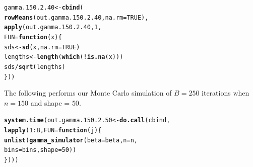 \documentclass[11pt]{article}\usepackage[]{graphicx}\usepackage[]{color}
\makeatletter
\newcommand{\hlnum}[1]{\textcolor[rgb]{0.686,0.059,0.569}{#1}}%
\newcommand{\hlopt}[1]{\textcolor[rgb]{0,0,0}{#1}}%
\newcommand{\hlstd}[1]{\textcolor[rgb]{0.345,0.345,0.345}{#1}}%
\newcommand{\hlkwa}[1]{\textcolor[rgb]{0.161,0.373,0.58}{\textbf{#1}}}%
\newcommand{\hlkwb}[1]{\textcolor[rgb]{0.69,0.353,0.396}{#1}}%
\newcommand{\hlkwc}[1]{\textcolor[rgb]{0.333,0.667,0.333}{#1}}%
\newcommand{\hlkwd}[1]{\textcolor[rgb]{0.737,0.353,0.396}{\textbf{#1}}}%
\newenvironment{kframe}{%
 \def\at@end@of@kframe{}%
 \ifinner\ifhmode%
  \def\at@end@of@kframe{\end{minipage}}%
  \begin{minipage}{\columnwidth}%
 \fi\fi%
 \def\FrameCommand##1{\hskip\@totalleftmargin \hskip-\fboxsep
 \colorbox{shadecolor}{##1}\hskip-\fboxsep
     \hskip-\linewidth \hskip-\@totalleftmargin \hskip\columnwidth}%
 \MakeFramed {\advance\hsize-\width
   \@totalleftmargin\z@ \linewidth\hsize
   \@setminipage}}%
 {\par\unskip\endMakeFramed%
 \at@end@of@kframe}
\newenvironment{knitrout}{}{} %
\makeatother
\begin{document}
\begin{knitrout}
\color{fgcolor}\begin{kframe}
\begin{alltt}
\hlstd{gamma.150.2.40} \hlkwb{<-} \hlkwd{cbind}\hlstd{(}
  \hlkwd{rowMeans}\hlstd{(out.gamma.150.2.40,} \hlkwc{na.rm} \hlstd{=} \hlnum{TRUE}\hlstd{),}
  \hlkwd{apply}\hlstd{(out.gamma.150.2.40,} \hlnum{1}\hlstd{,}
  \hlkwc{FUN} \hlstd{=} \hlkwa{function}\hlstd{(}\hlkwc{x}\hlstd{)\{}
    \hlstd{sds} \hlkwb{<-} \hlkwd{sd}\hlstd{(x,} \hlkwc{na.rm} \hlstd{=} \hlnum{TRUE}\hlstd{)}
    \hlstd{lengths} \hlkwb{<-} \hlkwd{length}\hlstd{(}\hlkwd{which}\hlstd{(}\hlopt{!}\hlkwd{is.na}\hlstd{(x)))}
    \hlstd{sds} \hlopt{/} \hlkwd{sqrt}\hlstd{(lengths)}
  \hlstd{\}))}
\end{alltt}


{\ttfamily\noindent\bfseries\color{errorcolor}{\#\# Error in is.data.frame(x): object 'out.gamma.150.2.40' not found}}\end{kframe}
\end{knitrout}

The following performs our Monte Carlo simulation of $B = 250$ iterations 
when $n = 150$ and shape = $50$.

\begin{knitrout}
\color{fgcolor}\begin{kframe}
\begin{alltt}
\hlkwd{system.time}\hlstd{(out.gamma.150.2.50} \hlkwb{<-} \hlkwd{do.call}\hlstd{(cbind,}
  \hlkwd{lapply}\hlstd{(}\hlnum{1}\hlopt{:}\hlstd{B,} \hlkwc{FUN} \hlstd{=} \hlkwa{function}\hlstd{(}\hlkwc{j}\hlstd{)\{}
    \hlkwd{unlist}\hlstd{(}\hlkwd{gamma_simulator}\hlstd{(}\hlkwc{beta} \hlstd{= beta,} \hlkwc{n} \hlstd{= n,}
      \hlkwc{bins} \hlstd{= bins,} \hlkwc{shape} \hlstd{=} \hlnum{50}\hlstd{))}
\hlstd{\})))}
\end{alltt}


{\ttfamily\noindent\bfseries\color{errorcolor}{\#\# Error in eval(predvars, data, env): object 'x1' not found}}

{\ttfamily\noindent\itshape\color{messagecolor}{\#\# Timing stopped at: 0.002 0 0.002}}\end{kframe}
\end{knitrout}
\end{document}

